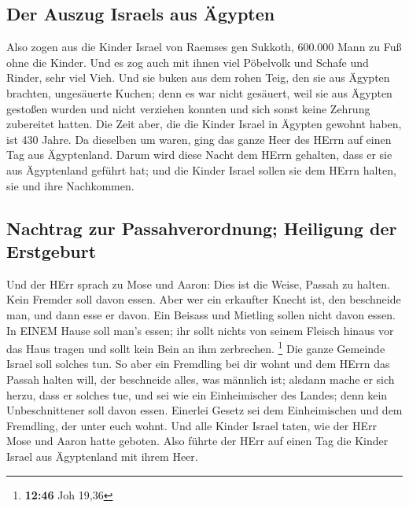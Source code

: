 \hypertarget{der-auszug-israels-aus-uxe4gypten}{%
\subsection{Der Auszug Israels aus
Ägypten}\label{der-auszug-israels-aus-uxe4gypten}}

 Also zogen aus die Kinder Israel von Raemses gen
Sukkoth, 600.000 Mann zu Fuß ohne die Kinder.  Und es zog
auch mit ihnen viel Pöbelvolk und Schafe und Rinder, sehr viel Vieh.
 Und sie buken aus dem rohen Teig, den sie aus Ägypten
brachten, ungesäuerte Kuchen; denn es war nicht gesäuert, weil sie aus
Ägypten gestoßen wurden und nicht verziehen konnten und sich sonst keine
Zehrung zubereitet hatten.  Die Zeit aber, die die Kinder
Israel in Ägypten gewohnt haben, ist 430 Jahre.  Da
dieselben um waren, ging das ganze Heer des HErrn auf einen Tag aus
Ägyptenland.  Darum wird diese Nacht dem HErrn gehalten,
dass er sie aus Ägyptenland geführt hat; und die Kinder Israel sollen
sie dem HErrn halten, sie und ihre Nachkommen.

\hypertarget{nachtrag-zur-passahverordnung-heiligung-der-erstgeburt}{%
\subsection{Nachtrag zur Passahverordnung; Heiligung der
Erstgeburt}\label{nachtrag-zur-passahverordnung-heiligung-der-erstgeburt}}

 Und der HErr sprach zu Mose und Aaron: Dies ist die
Weise, Passah zu halten. Kein Fremder soll davon essen. 
Aber wer ein erkaufter Knecht ist, den beschneide man, und dann esse er
davon.  Ein Beisass und Mietling sollen nicht davon
essen.  In EINEM Hause soll man's essen; ihr sollt nichts
von seinem Fleisch hinaus vor das Haus tragen und sollt kein Bein an ihm
zerbrechen. \footnote{\textbf{12:46} Joh 19,36}  Die
ganze Gemeinde Israel soll solches tun.  So aber ein
Fremdling bei dir wohnt und dem HErrn das Passah halten will, der
beschneide alles, was männlich ist; alsdann mache er sich herzu, dass er
solches tue, und sei wie ein Einheimischer des Landes; denn kein
Unbeschnittener soll davon essen.  Einerlei Gesetz sei
dem Einheimischen und dem Fremdling, der unter euch wohnt.
 Und alle Kinder Israel taten, wie der HErr Mose und
Aaron hatte geboten.  Also führte der HErr auf einen Tag
die Kinder Israel aus Ägyptenland mit ihrem Heer.

